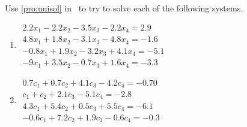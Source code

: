 \begin{exercise}  
Use \cref{pro:unisol} in \script\ to try to solve each of the following systems.
\begin{enumerate}
\item \(\begin{array}{l}
2.2x_1  -2.2x_2  -3.5x_3  -2.2x_4=   2.9\\
   4.8x_1+   1.8x_2  -3.1x_3  -4.8x_4=  -1.6\\
  -0.8x_1+   1.9x_2  -3.2x_3+   4.1x_4=  -5.1\\
  -9x_1+   3.5x_2  -0.7x_3+   1.6x_4=  -3.3\end{array}\)

\item \(\begin{array}{l}
   0.7c_1+   0.7c_2+   4.1c_3  -4.2c_4=  -0.70\\
   c_1+  c_2+  2.1c_3 -5.1c_4= -2.8\\
   4.3c_1+  5.4c_2+  0.5c_3+  5.5c_4= -6.1\\
  -0.6c_1+  7.2c_2+  1.9c_3 -0.6c_4= -0.3\end{array}\)

%
\end{enumerate}
\end{exercise}





